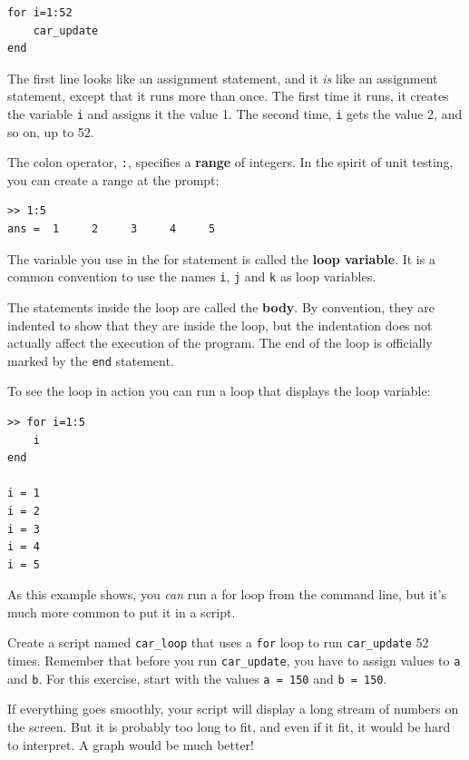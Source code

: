\documentclass{book}
\begin{document}
\begin{verbatim}
for i=1:52
    car_update
end
\end{verbatim}

The first line looks like an assignment statement, and it {\em is}
like an assignment statement, except that it runs more than once.  The
first time it runs, it creates the variable {\tt i} and assigns it the
value 1.  The second time, {\tt i} gets the value 2, and so on, up to
52.

The colon operator, {\tt :}, specifies a {\bf range} of integers.  In
the spirit of unit testing, you can create a range at the prompt:

\begin{verbatim}
>> 1:5
ans =  1     2     3     4     5
\end{verbatim}

The variable you use in the for statement is called the {\bf loop
variable}.  It is a common convention to use the names {\tt i},
{\tt j} and {\tt k} as loop variables.

The statements inside the loop are called the {\bf body}.  By convention,
they are indented to show that they are inside the loop, but the
indentation does not actually affect the execution of the program.
The end of the loop is officially marked by the {\tt end} statement.

To see the loop in action you can run a loop that displays the
loop variable:

\begin{verbatim}
>> for i=1:5
    i
end

i = 1
i = 2
i = 3
i = 4
i = 5
\end{verbatim}

As this example shows, you {\em can} run a for loop from the
command line, but it's much more common to put it in a script.

\begin{ex}
Create a script named {\tt car\_loop} that uses a {\tt for}
loop to run {\tt car\_update} 52 times.  Remember that before you run
{\tt car\_update}, you have to assign values to {\tt a} and {\tt b}.
For this exercise, start with the values {\tt a = 150} and {\tt b =
150}.

If everything goes smoothly, your script will display a long stream
of numbers on the screen.  But it is probably too long
to fit, and even if it fit, it would be hard to interpret.  
A graph would be much better!
\end{ex}
\end{document}

